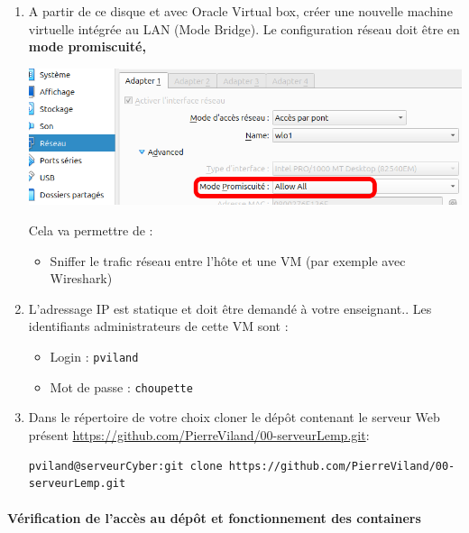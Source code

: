 \documentclass[french, 12pt]{article}%
\newcommand{\itemE}{\item[$\bullet$]}
\begin{document}
\begin{enumerate}
\item A partir de ce disque et avec Oracle Virtual box, créer une nouvelle machine virtuelle intégrée au LAN (Mode Bridge). Le configuration réseau doit être en \textbf{mode promiscuité,}

\begin{center}
\includegraphics[scale=0.4]{./ressource/modeProm.png}
\end{center}
Cela va permettre de : 
	\begin{itemize}
	\itemE Sniffer le trafic réseau entre l'hôte et une VM (par exemple avec Wireshark)
	\end{itemize}

\item L'adressage IP est statique et doit être demandé à votre enseignant.. Les identifiants administrateurs de cette VM sont : 
	\begin{itemize}
	\itemE Login : \verb?pviland?
	\itemE Mot de passe : \verb?choupette?
	\end{itemize}
\item Dans le répertoire de votre choix cloner le dépôt contenant le serveur Web présent \href{https://github.com/PierreViland/00-serveurLemp.git}{https://github.com/PierreViland/00-serveurLemp.git}: 

	\begin{lstlisting}[style=commande]
pviland@serveurCyber:git clone https://github.com/PierreViland/00-serveurLemp.git
\end{lstlisting}
	
\end{enumerate}


\paragraph{Vérification de l'accès au dépôt et fonctionnement des containers}
\end{document}
